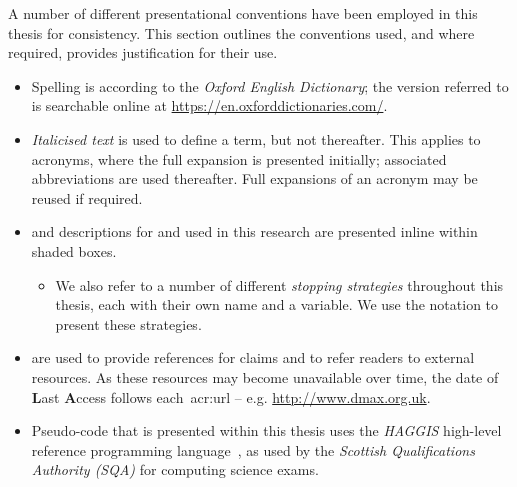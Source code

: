
\begin{preamble}
{}

A number of different presentational conventions have been employed in this thesis for consistency. This section outlines the conventions used, and where required, provides justification for their use.


\begin{itemize}
    
    \item{Spelling is according to the \emph{Oxford English Dictionary}; the version referred to is searchable online at \url{https://en.oxforddictionaries.com/}.}
    
    \item{\emph{Italicised text} is used to define a term, but not thereafter. This applies to acronyms, where the full expansion is presented initially; associated abbreviations are used thereafter. Full expansions of an acronym may be reused if required.}
    
    \item{ and descriptions for  and  used in this research are presented inline within shaded boxes.}
    
    \begin{itemize}
        
        \item{We also refer to a number of different \emph{stopping strategies} throughout this thesis, each with their own name and a variable. We use the notation  to present these strategies.}
        
    \end{itemize}
    
    \item{ are used to provide references for claims and to refer readers to external resources. As these resources may become unavailable over time, the date of \textbf{L}ast \textbf{A}ccess follows each~\gls{acr:url} -- e.g. \url{http://www.dmax.org.uk}.}
    
    \item{Pseudo-code that is presented within this thesis uses the \emph{HAGGIS} high-level reference programming language~\citep{cutts2014haggis}, as used by the \emph{Scottish Qualifications Authority (SQA)} for computing science exams.}
    

\end{itemize}
\end{preamble}
